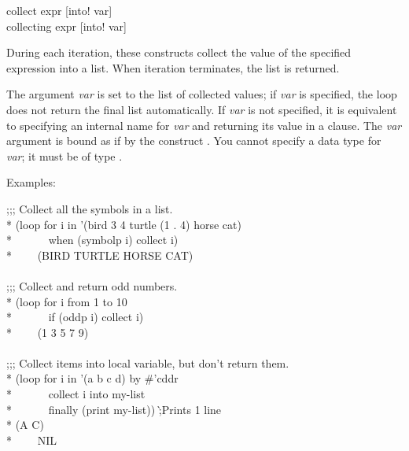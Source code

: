 \begin{defloop}
collect expr [\!into! var] \\
collecting expr [\!into! var]

During each iteration, these constructs collect the value of the specified 
expression into a list. When iteration terminates, the list is returned.

The argument \emph{var\/} is 
set to the list of collected values; if \emph{var} is specified, the loop
does not return the final list automatically.  If \emph{var} is not
specified, it is equivalent to specifying an internal name for
\emph{var} and returning its value in a  clause.
The \emph{var\/} argument
is bound as if by the construct .
You cannot specify a data type for \emph{var\/}; it must be of type .


Examples:
\begin{lisp}
;;; Collect all the symbols in a list. \\*
(loop for i in '(bird 3 4 turtle (1 . 4) horse cat) \\*
~~~~~~when (symbolp i) collect i) \\*
~~~\EV~(BIRD TURTLE HORSE CAT) \\
 \\
;;; Collect and return odd numbers. \\*
(loop for i from 1 to 10 \\*
~~~~~~if (oddp i) collect i) \\*
~~~\EV~(1 3 5 7 9) \\
 \\
;;; Collect items into local variable, but don't return them. \\*
(loop for i in '(a b c d) by \#'cddr \\*
~~~~~~collect i into my-list \\*
~~~~~~finally (print my-list)) \`;\textrm{Prints 1 line}\\*
(A C)  \\*
~~~\EV~NIL
\end{lisp}
\end{defloop}

